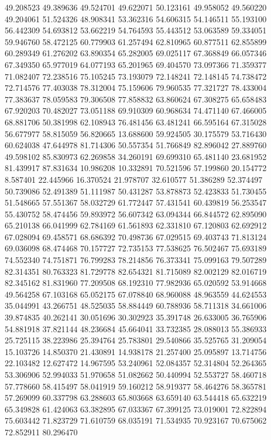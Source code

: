 49.208523
49.389636
49.524701
49.622071
50.123161
49.958052
49.560220
49.204061
51.524326
48.908341
53.362316
54.606315
54.146511
55.193100
56.442309
54.693812
53.662219
54.764593
55.443512
53.063589
59.334051
59.946760
58.472125
60.779903
61.257494
62.810965
60.877511
62.855899
60.289349
61.276202
63.890354
65.282005
69.025117
67.368849
66.057346
67.349350
65.977019
64.077193
65.201965
69.404570
73.097366
71.359377
71.082407
72.238516
75.105245
73.193079
72.148241
72.148145
74.738472
72.714576
77.403038
78.312004
75.159606
79.960535
77.321727
78.433004
77.383637
78.059583
79.306508
77.858832
63.860624
67.308275
65.658483
67.920203
70.482027
73.051188
69.910309
60.968634
74.471140
67.466005
68.881706
50.381998
62.108943
76.481456
63.481241
66.595164
67.315028
56.677977
58.815059
56.820665
13.688600
59.924505
30.175579
53.716430
60.624038
47.644978
81.714306
50.557354
51.766849
82.896042
27.889760
49.598102
85.830973
62.269858
34.260191
69.699310
65.481140
23.681952
81.439917
87.831634
10.986208
10.332891
70.521596
57.199860
20.154772
8.587401
22.445966
16.370524
21.978707
32.610577
51.386289
52.374497
50.739086
52.491389
51.111987
50.431287
53.878873
52.423833
51.730455
51.548665
57.551367
58.032729
61.772447
57.431541
60.439819
56.253547
55.430752
58.474456
59.893972
56.607342
63.094344
66.844572
62.895090
65.210138
66.041999
62.784169
61.561893
62.331810
67.120803
62.692912
67.028094
69.458571
68.686392
70.498736
67.029515
69.403743
71.813124
69.036098
68.474468
70.157727
72.735153
77.538625
76.502467
75.693189
74.552340
74.751871
76.799283
78.214856
76.373341
75.099163
79.507289
82.314351
80.763323
81.729778
82.654321
81.715089
82.002129
82.016719
82.345162
81.831960
77.209508
68.192310
77.982936
65.020592
53.914668
49.564258
67.103168
65.052175
67.078840
68.960088
48.963559
44.624553
35.044991
43.266751
48.525035
58.884449
60.788936
58.711318
34.661006
39.874835
40.262141
30.051696
30.302923
35.391748
26.633005
36.765906
54.881918
37.821144
48.236684
45.664041
33.732385
28.088013
55.386933
25.725115
38.223986
25.394764
25.783801
29.540866
35.525765
31.209054
15.103726
14.850370
21.430891
14.938178
21.257400
25.095897
13.714756
22.103482
12.627472
14.967595
53.240961
52.084357
52.314804
52.264365
53.306906
52.994033
51.970658
51.082662
50.440994
52.553727
58.460718
57.778660
58.415497
58.041919
59.160212
58.919377
58.464276
58.365781
57.269099
60.337798
63.288603
65.803668
63.659140
63.544418
65.632219
65.349828
61.424063
63.382895
67.033367
67.399125
73.019001
72.822894
75.603442
71.823729
71.610759
68.035191
71.534935
70.923167
70.675062
72.852911
80.296470
